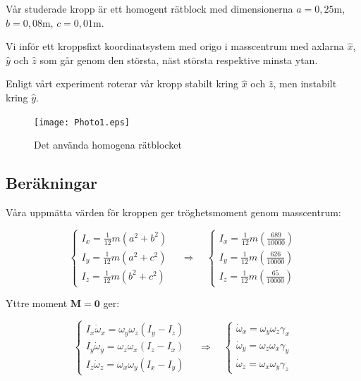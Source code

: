\documentclass[12pt,a4paper]{article}
\begin{document}
		Vår studerade kropp är ett homogent rätblock med dimensionerna
		$a = 0,25 \mathrm{m}$, $b = 0,08 \mathrm{m}$, $c = 0,01 \mathrm{m}$.
		
		Vi inför ett kroppsfixt koordinatsystem med origo i masscentrum med axlarna
		$\hat{x}$, $\hat{y}$ och $\hat{z}$ som går genom den största, näst
		största respektive minsta ytan.
		
		Enligt vårt experiment roterar vår kropp stabilt kring $\hat{x}$ och $\hat{z}$, men
		instabilt kring $\hat{y}$.
		
		\begin{figure}
			\begin{center}
				\texttt{[image: Photo1.eps]}
				\caption{Det använda homogena rätblocket}
			\end{center}
		\end{figure}
		
	\subsection{Beräkningar}
		
		Våra uppmätta värden för kroppen ger tröghetsmoment genom masscentrum:
		
		\begin{equation*}
			\begin{cases}
				I_x = \frac{1}{12} m (a^2 + b^2) \\
				I_y = \frac{1}{12} m (a^2 + c^2) \\
				I_z = \frac{1}{12} m (b^2 + c^2) 
			\end{cases}
			\hspace{12pt}
			\Rightarrow
			\hspace{12pt}
			\begin{cases}
				I_x = \frac{1}{12} m (\frac{689}{10000}) \\
				I_y = \frac{1}{12} m (\frac{626}{10000}) \\
				I_z = \frac{1}{12} m (\frac{65}{10000})
			\end{cases}
		\end{equation*}
		
		Yttre moment $\mathbf{M}=\mathbf{0}$ ger:
		
		\begin{equation*}
			\begin{cases}
				I_x \dot{\omega}_x = \omega_y \omega_z (I_y - I_z) \\
				I_y \dot{\omega}_y = \omega_z \omega_x (I_z - I_x) \\
				I_z \dot{\omega}_z = \omega_x \omega_y (I_x - I_y)
			\end{cases}
			\hspace{12pt}
			\Rightarrow
			\hspace{12pt}
			\begin{cases}
				\dot{\omega}_x = \omega_y \omega_z \gamma_x \\
				\dot{\omega}_y = \omega_z \omega_x \gamma_y \\
				\dot{\omega}_z = \omega_x \omega_y \gamma_z
			\end{cases}
		\end{equation*}
		
\end{document}
